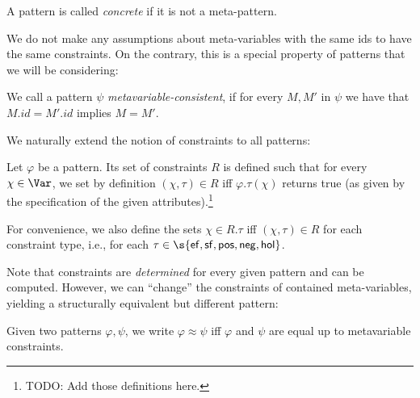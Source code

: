 \documentclass{mgr}
\begin{document}
\begin{definition}
  A pattern is called \emph{concrete} if it is not a meta-pattern.
\end{definition}

We do not make any assumptions about meta-variables with the same ids to have the same constraints.
On the contrary, this is a special property of patterns that we will be considering:
\begin{definition}
  We call a pattern $\psi$ \emph{metavariable-consistent}, if for every $M, M'$ in $\psi$ we have that $M.id = M'.id$ implies $M = M'$.
\end{definition}

\iffalse
\begin{definition}[Pattern renaming]
  Let $\varphi$ a pattern.
  Then $\psi$ is a renaming of $\varphi$ if there is a variable renaming $s : \Var \to \Var$ such that $\psi s$ is $\alpha$-equivalent to $\varphi$.
\end{definition}
\fi

We naturally extend the notion of constraints to all patterns:

\begin{definition}
  Let $\varphi$ be a pattern.
  Its set of constraints $R$ is defined such that for every $\chi \in \Var$, we set by definition $(\chi, \tau) \in R$ iff $\varphi.\tau(\chi)$ returns true (as given by the specification of the given attributes).\footnote{TODO: Add those definitions here.}

  For convenience, we also define the sets $\chi \in R.\tau$ iff $(\chi, \tau) \in R$ for each constraint type, i.e., for each $\tau \in \s{\Ef, \Sf, \Pos, \Neg, \Hol}$.
\end{definition}

Note that constraints are \emph{determined} for every given pattern and can be computed.
However, we can ``change'' the constraints of contained meta-variables, yielding a structurally equivalent but different pattern:
\begin{definition}
  Given two patterns $\varphi, \psi$, we write $\varphi \approx \psi$ iff $\varphi$ and $\psi$ are equal up to metavariable constraints.
\end{definition}
\end{document}
